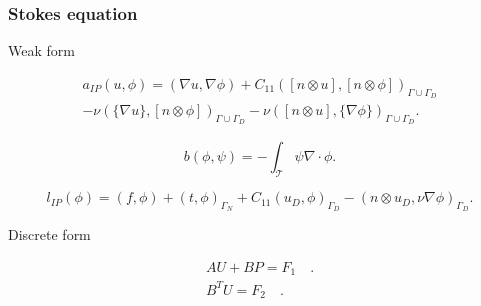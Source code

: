 \documentclass{beamer}
\begin{document}
\begin{frame}
\frametitle{Stokes equation}
\begin{block}{Weak form}

\begin{equation}
\begin{split}
a_{IP}(u,\phi) = (\nabla u, \nabla \phi) + C_{11} ([n \otimes u],[n \otimes \phi])_{\Gamma \cup \Gamma_D} \\ - \nu (\{\nabla u\},[n \otimes \phi])_{\Gamma \cup \Gamma_D} - \nu ([n \otimes u],\{\nabla \phi\})_{\Gamma \cup \Gamma_D} \textrm{.}
\end{split}
\end{equation}

\begin{equation}
b(\phi,\psi) = -\int_{\mathcal{T}} \psi \nabla \cdot \phi \textrm{.}
\end{equation}

\begin{equation}
l_{IP}(\phi) = (f,\phi) + (t,\phi)_{\Gamma_N} + C_{11} (u_D,\phi)_{\Gamma_D} - (n \otimes u_D, \nu \nabla \phi)_{\Gamma_D} \textrm{.}
\end{equation}

\end{block}

\begin{block}{Discrete form}

\begin{equation} \label{stokes discrete_ch3}
\begin{split}
AU + BP = F_1 \quad \textrm{.}\\
B^T U  = F_2 \quad \textrm{.}
\end{split}
\end{equation}

\end{block}
\end{frame}
\end{document}
